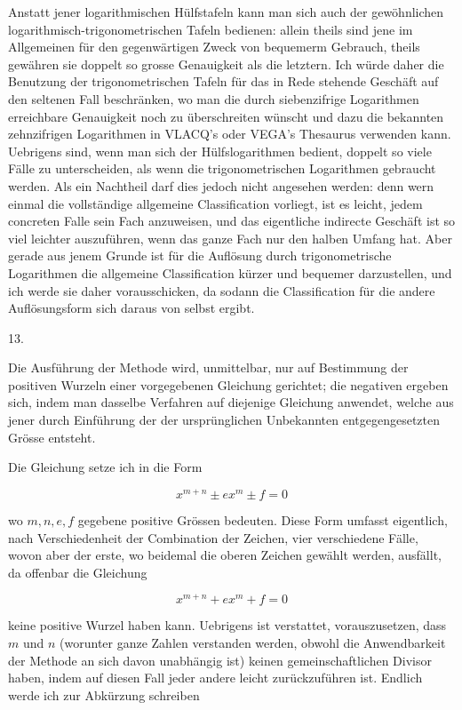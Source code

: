 \documentclass[10pt]{article}
\begin{document}
Anstatt jener logarithmischen Hülfstafeln kann man sich auch der gewöhnlichen logarithmisch-trigonometrischen Tafeln bedienen: allein theils sind jene im Allgemeinen für den gegenwärtigen Zweck von bequemerm Gebrauch, theils gewähren sie doppelt so grosse Genauigkeit als die letztern. Ich würde daher die Benutzung der trigonometrischen Tafeln für das in Rede stehende Geschäft auf den seltenen Fall beschränken, wo man die durch siebenzifrige Logarithmen erreichbare Genauigkeit noch zu überschreiten wünscht und dazu die bekannten zehnzifrigen Logarithmen in VLACQ's oder VEGA's Thesaurus verwenden kann. Uebrigens sind, wenn man sich der Hülfslogarithmen bedient, doppelt so viele Fälle zu unterscheiden, als wenn die trigonometrischen Logarithmen gebraucht werden. Als ein Nachtheil darf dies jedoch nicht angesehen werden: denn wern einmal die vollständige allgemeine Classification vorliegt, ist es leicht, jedem concreten Falle sein Fach anzuweisen, und das eigentliche indirecte Geschäft ist so viel leichter auszuführen, wenn das ganze Fach nur den halben Umfang hat. Aber gerade aus jenem Grunde ist für die Auflösung durch trigonometrische Logarithmen die allgemeine Classification kürzer und bequemer darzustellen, und ich werde sie daher vorausschicken, da sodann die Classification für die andere Auflösungsform sich daraus von selbst ergibt.

13.

Die Ausführung der Methode wird, unmittelbar, nur auf Bestimmung der positiven Wurzeln einer vorgegebenen Gleichung gerichtet; die negativen ergeben
sich, indem man dasselbe Verfahren auf diejenige Gleichung anwendet, welche aus jener durch Einführung der der ursprünglichen Unbekannten entgegengesetzten Grösse entsteht.

Die Gleichung setze ich in die Form

\[
x^{m+n} \pm e x^{m} \pm f=0
\]

wo \(m, n, e, f\) gegebene positive Grössen bedeuten. Diese Form umfasst eigentlich, nach Verschiedenheit der Combination der Zeichen, vier verschiedene Fälle, wovon aber der erste, wo beidemal die oberen Zeichen gewählt werden, ausfällt, da offenbar die Gleichung

\[
x^{m+n}+e x^{m}+f=0
\]

keine positive Wurzel haben kann. Uebrigens ist verstattet, vorauszusetzen, dass \(m\) und \(n\) (worunter ganze Zahlen verstanden werden, obwohl die Anwendbarkeit der Methode an sich davon unabhängig ist) keinen gemeinschaftlichen Divisor haben, indem auf diesen Fall jeder andere leicht zurückzuführen ist. Endlich werde ich zur Abkürzung schreiben
\end{document}
